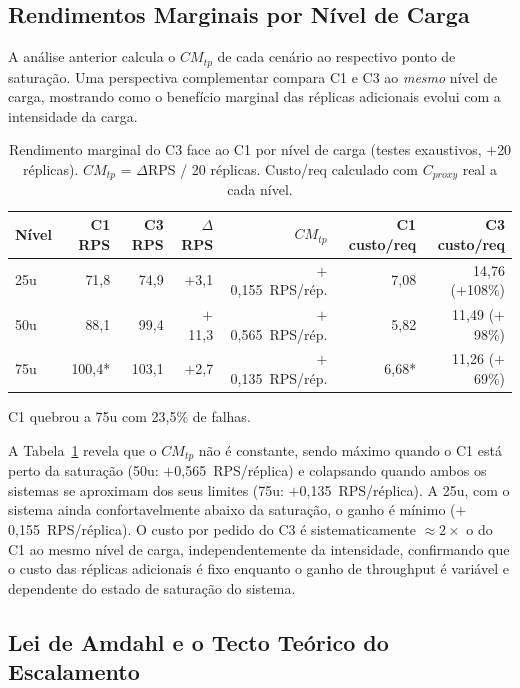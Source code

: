 \documentclass[manuscript,screen,review]{acmart}
\begin{document}
\subsection{Rendimentos Marginais por Nível de Carga}
\label{subsec:rendimentos}

A análise anterior calcula o $CM_{tp}$ de cada cenário ao respectivo ponto de saturação. Uma perspectiva complementar compara C1 e C3 ao \emph{mesmo} nível de carga, mostrando como o benefício marginal das réplicas adicionais evolui com a intensidade da carga.

\begin{table}[t]
\caption{Rendimento marginal do C3 face ao C1 por nível de carga (testes exaustivos, $+$20 réplicas). $CM_{tp}$ = $\Delta$RPS / 20 réplicas. Custo/req calculado com $C_{proxy}$ real a cada nível.}
\label{tab:marginal-nivel}
\begin{tabular}{lrrrrrr}
\toprule
\textbf{Nível} & \textbf{C1 RPS} & \textbf{C3 RPS} & \textbf{$\Delta$RPS} & \textbf{$CM_{tp}$} & \textbf{C1 custo/req} & \textbf{C3 custo/req} \\
\midrule
25u & 71,8 & 74,9 & $+$3,1 & $+$0,155~RPS/rép. & 7,08 & 14,76 (+108\%) \\
50u & 88,1 & 99,4 & $+$11,3 & $+$0,565~RPS/rép. & 5,82 & 11,49 ($+$98\%) \\
75u & 100,4* & 103,1 & $+$2,7 & $+$0,135~RPS/rép. & 6,68* & 11,26 ($+$69\%) \\
\bottomrule
\end{tabular}
\end{table}
{\small *C1 quebrou a 75u com 23,5\% de falhas.}

A Tabela~\ref{tab:marginal-nivel} revela que o $CM_{tp}$ não é constante, sendo máximo quando o C1 está perto da saturação (50u: $+$0,565~RPS/réplica) e colapsando quando ambos os sistemas se aproximam dos seus limites (75u: $+$0,135~RPS/réplica). A 25u, com o sistema ainda confortavelmente abaixo da saturação, o ganho é mínimo ($+$0,155~RPS/réplica). O custo por pedido do C3 é sistematicamente $\approx 2\times$ o do C1 ao mesmo nível de carga, independentemente da intensidade, confirmando que o custo das réplicas adicionais é fixo enquanto o ganho de throughput é variável e dependente do estado de saturação do sistema.

\subsection{Lei de Amdahl e o Tecto Teórico do Escalamento}
\label{subsec:amdahl}
\end{document}
